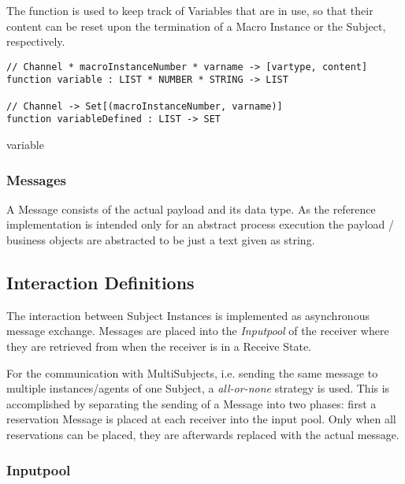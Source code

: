 The function  is used to keep track of Variables that are in use, so that their content can be reset upon the termination of a Macro Instance or the Subject, respectively.

\begin{listing}[htbp]
\begin{verbatim}
// Channel * macroInstanceNumber * varname -> [vartype, content]
function variable : LIST * NUMBER * STRING -> LIST

// Channel -> Set[(macroInstanceNumber, varname)]
function variableDefined : LIST -> SET
\end{verbatim}
\caption{variable}
\label{lst:shortasm:variable}
\end{listing}


\subsubsection{Messages}\label{sec:messages}

A Message consists of the actual payload and its data type. As the reference implementation is intended only for an abstract process execution the payload / business objects are abstracted to be just a text given as string.

\subsection{Interaction Definitions}
\label{sec:InteractionDefinitions}

The interaction between Subject Instances is implemented as asynchronous message exchange. Messages are placed into the \textit{Inputpool} of the receiver where they are retrieved from when the receiver is in a Receive State.

For the communication with MultiSubjects, i.e. sending the same message to multiple instances/agents of one Subject, a \textit{all-or-none} strategy is used. This is accomplished by separating the sending of a Message into two phases: first a reservation Message is placed at each receiver into the input pool. Only when all reservations can be placed, they are afterwards replaced with the actual message.



\subsubsection{Inputpool}\label{sec:Inputpool}

